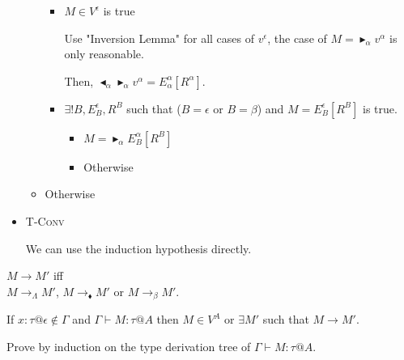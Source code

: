 \documentclass[9pt, a4paper]{extarticle}
\theoremstyle{break}
\newcommand{\G}{\Gamma}
\newcommand{\V}{\vdash}
\newcommand{\TB}{\blacktriangleright}
\newcommand{\TBL}{\blacktriangleleft}
\newcommand{\TConv}{\textsc{T-Conv}}
\begin{document}
\begin{itemize}
\begin{itemize}
            \begin{itemize}
                \item $ M \in V^\epsilon$ is true
                
                Use "Inversion Lemma" for all cases of $v^\epsilon$, the case of $ M = \TB_\alpha v^\alpha $ is only reasonable.
                
                Then, $\TBL_\alpha \TB_\alpha v^\alpha = E^\alpha_\alpha [R^\alpha]$.

                \item $\exists ! B, E^\epsilon_B, R^B$ such that ($B = \epsilon$ or $B = \beta$) and $M = E^\epsilon_B[R^B]$ is true.
                
                \begin{itemize}
                    \item $ M = \TB_\alpha E^\alpha_B[R^B] $
                    \item Otherwise
                \end{itemize}
            \end{itemize}

        \item Otherwise

    \end{itemize}

    \item \TConv
    
        We can use the induction hypothesis directly.

\end{itemize}

\begin{dfn}[Reduction]
    $ M \longrightarrow M'$ iff \\
    $ M \longrightarrow_\Lambda M' $, $ M \longrightarrow_\blacklozenge M' $ or $ M \longrightarrow_\beta M' $.
\end{dfn}

\begin{thm}[Progress]
    If $x:\tau@\epsilon \notin \G$ and $\G \V M : \tau @ A$ then $ M \in V^A $ or $\exists M'$ such that $M \longrightarrow M'$.
\end{thm}

Prove by induction on the type derivation tree of $\G \V M:\tau@A$.
\end{document}
